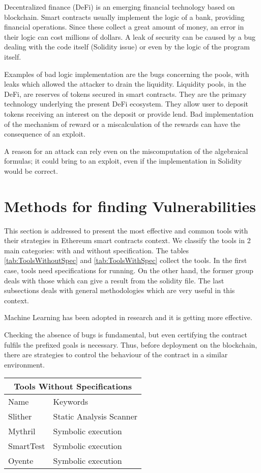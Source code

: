 \documentclass[a4paper,sigconf, language=french,
language=german, language=spanish, language=english]{acmart}
\begin{document}
Decentralized finance (DeFi) is an emerging financial technology based on blockchain. Smart contracts usually implement the logic of a bank, providing financial operations. Since these collect a great amount of money, an error in their logic can cost millions of dollars. A leak of security can be caused by a bug dealing with the code itself (Solidity issue) or even by the logic of the program itself.  

Examples of bad logic implementation are the bugs concerning the pools, with leaks which allowed the attacker to drain the liquidity.
Liquidity pools, in the DeFi, are reserves of tokens secured in smart contracts. They are the primary technology underlying the present DeFi ecosystem. They allow user to deposit tokens receiving an interest on the deposit or provide lend. Bad implementation of the mechanism of reward or a miscalculation of the rewards can have the consequence of an exploit. 

A reason for an attack can rely even on the miscomputation of the algebraical formulas; it could bring to an exploit, even if the implementation in Solidity would be correct.


\section{Methods for finding Vulnerabilities}
\label{MethodologiesForTools}
This section is addressed to present the most effective and common tools with their strategies in Ethereum smart contracts context. 
We classify the tools in 2 main categories: with and without specification. The tables \ref{tab:ToolsWithoutSpec} and \ref{tab:ToolsWithSpec} collect the tools. 
In the first case, tools need specifications for running. On the other hand,  the former group 
deals with those which can give a result from the solidity file.
The last subsections deals with general methodologies which are very useful in this context. 

Machine Learning has been adopted in research and it is getting more effective. 

Checking the absence of bugs is fundamental, but even certifying the contract fulfils the prefixed goals is necessary. Thus, before deployment on the blockchain, there are strategies to control the behaviour of the contract in a similar environment.

\begin{table*}
  \caption{Tools without Specifications}
  \label{tab:ToolsWithoutSpec}
  \begin{tabular}{ |p{5cm}|p{5cm}|  }
  \hline
  \multicolumn{2}{|c|}{Tools Without Specifications } \\
  \hline
  Name & Keywords\\
  \hline
  Slither & Static Analysis Scanner\\
  \hline
  Mythril & Symbolic execution \\
  \hline
  SmartTest & Symbolic execution\\
  \hline
  Oyente  & Symbolic execution \\
  \hline
 \end{tabular}
\end{table*}
 
\end{document}
